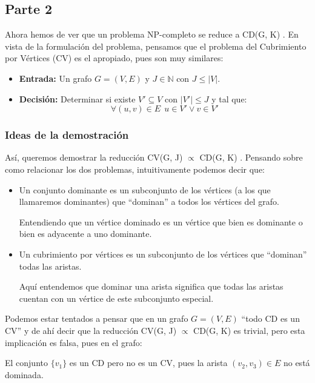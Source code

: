 \documentclass[12pt]{article}
\newcommand{\CD}{CD(G, K) }
\newcommand{\CV}{CV(G, J) }
\begin{document}
    \subsection{Parte 2}
    \noindent
    Ahora hemos de ver que un problema NP-completo se reduce a \CD. En vista de la formulación del problema, pensamos que el problema del Cubrimiento por Vértices (CV) es el apropiado, pues son muy similares:
    \begin{itemize}
        \item \textbf{Entrada:} Un grafo $G=(V,E)$ y $J\in \mathbb{N}$ con $J\leq |V|$.
        \item \textbf{Decisión:} Determinar si existe $V'\subseteq V$ con $|V'|\leq J$ y tal que:
            \begin{equation*}
                \forall (u,v)\in E~~ u\in V' \lor v\in V'
            \end{equation*}
    \end{itemize}
    \subsubsection{Ideas de la demostración}
    \noindent
    Así, queremos demostrar la reducción \CV $\propto$ \CD. Pensando sobre como relacionar los dos problemas, intuitivamente podemos decir que:
    \begin{itemize}
        \item Un conjunto dominante es un subconjunto de los vértices (a los que llamaremos dominantes) que ``dominan'' a todos los vértices del grafo.

            Entendiendo que un vértice dominado es un vértice que bien es dominante o bien es adyacente a uno dominante.
        \item Un cubrimiento por vértices es un subconjunto de los vértices que ``dominan'' todas las aristas.

            Aquí entendemos que dominar una arista significa que todas las aristas cuentan con un vértice de este subconjunto especial.
    \end{itemize}
    Podemos estar tentados a pensar que en un grafo $G = (V,E)$ ``todo CD es un CV'' y de ahí decir que la reducción \CV $\propto$ \CD es trivial, pero esta implicación es falsa, pues en el grafo:
    \begin{figure}[H]
        \centering
    \end{figure}
    \noindent
    El conjunto $\{v_1\}$ es un CD pero no es un CV, pues la arista $(v_2,v_3)\in E$ no está dominada.\\
\end{document}
